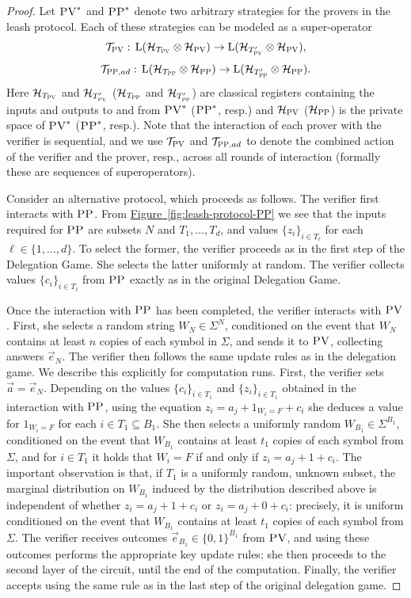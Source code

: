 \documentclass[11pt]{article}
\numberwithin{equation}{section}
\theoremstyle{definition}
\theoremstyle{plain}
\newcommand{\expref}[2]{\hyperref[#2]{#1~\ref{#2}}}
\newcommand{\setft}[1]{\mathrm{#1}}
\newcommand{\Lin}{\setft{L}}
\newcommand{\mH}{\mathcal{H}}
\newcommand{\pv}{\textsc{PV}}
\newcommand{\pp}{\textsc{PP}}
\begin{document}
\begin{proof}
Let $\pv^*$ and $\pp^*$ denote two arbitrary strategies for the provers in the leash protocol. Each of these strategies can be modeled as a super-operator 
$$\mathcal{T}_\pv:\, \Lin(\mH_{T_\pv} \otimes \mH_\pv) \to \Lin(\mH_{T'_\pv} \otimes \mH_\pv),$$
$$\mathcal{T}_{\pp,ad}: \,\Lin(\mH_{T_\pp} \otimes \mH_\pp) \to \Lin(\mH_{T'_\pp} \otimes \mH_\pp).$$
Here $\mH_{T_\pv}$ and $\mH_{T'_\pv}$ %
($\mH_{T_\pp}$ and $\mH_{T'_\pp}$) are classical registers containing the inputs and outputs to and from $\pv^*$ %
($\pp^*$, resp.)
and $\mH_\pv$ %
($\mH_\pp$)  %
is the private space of $\pv^*$ %
($\pp^*$, resp.).  %
Note that the interaction of each prover with the verifier is sequential, and we use $\mathcal{T}_{\pv}$ and $\mathcal{T}_{\pp,ad}$ to denote the combined action of the verifier and the prover, resp., %
 across all rounds of interaction (formally these are sequences of superoperators).  %

Consider an alternative protocol, which proceeds as follows. The verifier first interacts with $\pp$. From \expref{Figure}{fig:leash-protocol-PP} we see that the inputs required for $\pp$ are subsets $N$ and $T_1,\ldots,T_d$, and values $\{z_i\}_{i\in T_\ell}$ for each $\ell\in\{1,\ldots,d\}$. To select the former, the verifier proceeds as in the first step of the Delegation Game. She selects the latter uniformly at random. The verifier collects values $\{c_i\}_{i\in T_\ell}$ from $\pp$ exactly as in the original Delegation Game. 

Once the interaction with $\pp$ has been completed, the verifier interacts with $\pv$. First, she selects a random string $W_N\in \Sigma^N$, conditioned on the event that $W_N$ contains at least $n$ copies of each symbol in $\Sigma$, and sends it to $\pv$, collecting answers $\vec{e}_N$. The verifier then follows the same update rules as in the delegation game. We describe this explicitly for computation runs. First, the verifier sets $\vec{a} = \vec{e}_N$. Depending on the values $\{c_i\}_{i\in T_1}$ and $\{z_i\}_{i\in T_1}$ obtained in the interaction with $\pp$, using the equation $z_i = a_j + 1_{W_i=F}+c_i$ she deduces a value for $1_{W_i=F}$ for each $i\in T_1 \subseteq B_1$. She then selects a uniformly random $W_{B_1} \in \Sigma^{B_1}$, conditioned on the event that $W_{B_1}$ contains at least $t_1$ copies of each symbol from $\Sigma$, and for $i\in T_1$ it holds that $W_i=F$ if and only if $z_i = a_j + 1+c_i$. The important observation is that, if $T_1$ is a uniformly random, unknown subset, the marginal distribution on $W_{B_1}$ induced by the distribution described above is independent of whether $z_i = a_j + 1+c_i$ or $z_i = a_j + 0 +c_i$: precisely, it is uniform conditioned on the event that $W_{B_1}$ contains at least $t_1$ copies of each symbol from $\Sigma$. 
The verifier receives outcomes $\vec{e}_{B_1}\in \{0,1\}^{B_1}$ from $\pv$, and using these outcomes performs the appropriate key update rules; she then proceeds to the second layer of the circuit, until the end of the computation. Finally, the verifier accepts using the same rule as in the last step of the original delegation game. 


\end{proof}
\end{document}
